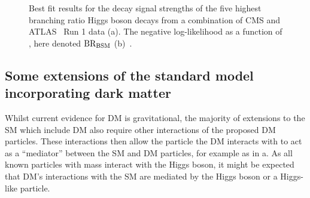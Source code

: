 \begin{figure}
  \caption{Best fit results for the decay signal strengths of the five highest branching ratio Higgs boson decays from a combination of CMS and ATLAS~\cite{Aad:1129811} Run 1 data (a). The negative log-likelihood as a function of \BRinv, here denoted $\rm{BR_{BSM}}$ (b)~\cite{CMS-PAS-HIG-15-002}.}
  \label{fig:smdecaymeasurement}
\end{figure}

\subsection{Some extensions of the standard model incorporating dark matter}
\label{sec:DMextensions}
Whilst current evidence for \ac{DM} is gravitational, the majority of extensions to the \ac{SM} which include \ac{DM} also require other interactions of the proposed \ac{DM} particles. These interactions then allow the particle the \ac{DM} interacts with to act as a ``mediator'' between the \ac{SM} and \ac{DM} particles, for example as in a. As all known particles with mass interact with the Higgs boson, it might be expected that \ac{DM}'s interactions with the \ac{SM} are mediated by the Higgs boson or a Higgs-like particle.

